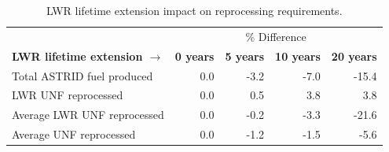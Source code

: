 \begin{table}[h]
	\centering
	\caption{\gls{LWR} lifetime extension impact on reprocessing requirements.}
	\begin{tabular}{lrrrr}
		\hline
		& \multicolumn{4}{c}{\% Difference} \\
		\textbf{\gls{LWR} lifetime extension $\longrightarrow$}& \textbf{0 years}& \textbf{5 years} & \textbf{10 years} & \textbf{20 years} \\
		\hline
		Total \gls{ASTRID} fuel produced & 0.0 & -3.2 & -7.0 & -15.4 \\
		\gls{LWR} \gls{UNF} reprocessed & 0.0  & 0.5 & 3.8 & 3.8 \\
		Average \gls{LWR} \gls{UNF} reprocessed & 0.0 & -0.2 & -3.3 & -21.6 \\
		Average \gls{UNF} reprocessed & 0.0 & -1.2 & -1.5 & -5.6 \\
		\hline
	\end{tabular}
	\label{tab:ext_met}
\end{table}
